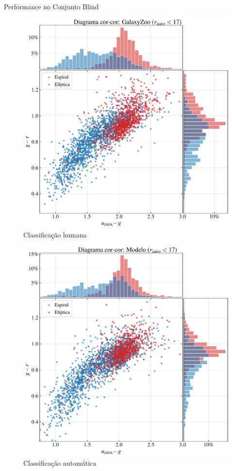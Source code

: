 \documentclass[10pt,xcolor=svgnames]{beamer}
\begin{document}
\begin{frame}{Performance no Conjunto Blind}
  \begin{minipage}{0.48\textwidth}
    \begin{figure}
      \includegraphics[width=\linewidth]{figures/zoo170_color_color.pdf}
      \caption{Classificação humana}
    \end{figure}
  \end{minipage}\hfill
  \begin{minipage}{0.48\textwidth}
    \begin{figure}
      \includegraphics[width=\linewidth]{figures/mn170_color_color.pdf}
      \caption{Classificação automática}
    \end{figure}
  \end{minipage}
\end{frame}
\end{document}
